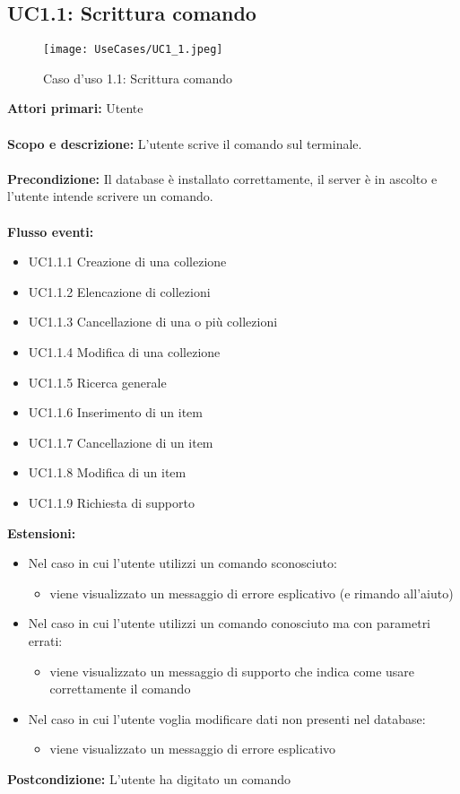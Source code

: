 \documentclass{scalatekids-article}
\begin{document}
\subsection{UC1.1: Scrittura comando}
\begin{figure}[H]
  \texttt{[image: UseCases/UC1\_1.jpeg]}
  \caption{Caso d'uso 1.1: Scrittura comando}
\end{figure}
\textbf{Attori primari:} Utente\\ \\
\textbf{Scopo e descrizione:} L’utente scrive il comando sul terminale.\\ \\
\textbf{Precondizione:} Il database è installato correttamente, il server è in ascolto e l'utente intende scrivere un comando.\\ \\
\textbf{Flusso eventi:}
\begin{itemize}
\item UC1.1.1 Creazione di una collezione
\item UC1.1.2 Elencazione di collezioni
\item UC1.1.3 Cancellazione di una o più collezioni
\item UC1.1.4 Modifica di una collezione
\item UC1.1.5 Ricerca generale
\item UC1.1.6 Inserimento di un item
\item UC1.1.7 Cancellazione di un item
\item UC1.1.8 Modifica di un item
\item UC1.1.9 Richiesta di supporto
\end{itemize}
\textbf{Estensioni:}
\begin{itemize}
\item Nel caso in cui l'utente utilizzi un comando sconosciuto:
  \begin{itemize}
  \item viene visualizzato un messaggio di errore esplicativo (e rimando all'aiuto)
  \end{itemize}
\item Nel caso in cui l'utente utilizzi un comando conosciuto ma con parametri errati:
  \begin{itemize}
  \item viene visualizzato un messaggio di supporto che indica come usare correttamente il comando
  \end{itemize}
\item Nel caso in cui l'utente voglia modificare dati non presenti nel database:
  \begin{itemize}
  \item viene visualizzato un messaggio di errore esplicativo
  \end{itemize}
\end{itemize}
\textbf{Postcondizione:} L'utente ha digitato un comando
\end{document}
